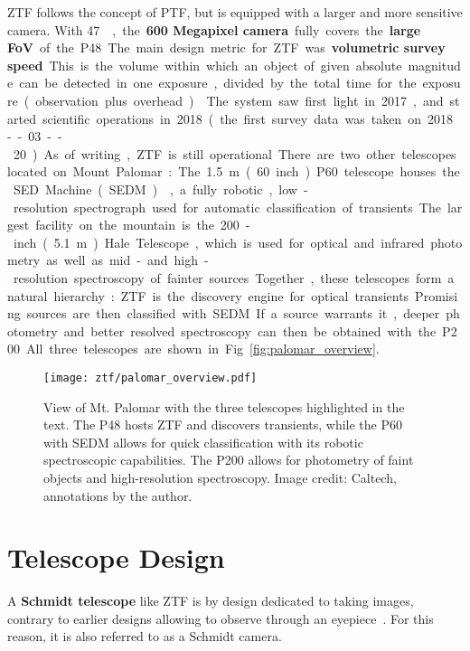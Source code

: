 ZTF follows the concept of PTF, but is equipped with a larger and more sensitive camera. With \SI{47}{\square\deg}, the \textbf{600 Megapixel camera} fully covers the \textbf{large FoV} of the P48. The main design metric for ZTF was \textbf{volumetric survey speed}. This is the volume within which an object of given absolute magnitude can be detected in one exposure, divided by the total time for the exposure (observation plus overhead)~. The system saw first light in 2017, and started scientific operations in 2018 (the first survey data was taken on 2018--03--20). As of writing, ZTF is still operational.

There are two other telescopes located on Mount Palomar: The \SI{1.5}{\meter} (60 inch) P60 telescope houses the SED Machine (SEDM)~, a fully robotic, low-resolution spectrograph used for automatic classification of transients. The largest facility on the mountain is the 200-inch (\SI{5.1}{\meter}) Hale Telescope, which is used for optical and infrared photometry as well as mid- and high-resolution spectroscopy of fainter sources. Together, these telescopes form a natural hierarchy: ZTF is the discovery engine for optical transients. Promising sources are then classified with SEDM. If a source warrants it, deeper photometry and better resolved spectroscopy can then be obtained with the P200. All three telescopes are shown in Fig.~\ref{fig:palomar_overview}.

\begin{figure*}[]
    \texttt{[image: ztf/palomar\_overview.pdf]}
    \caption[View of Mt. Palomar]{View of Mt. Palomar with the three telescopes highlighted in the text. The P48 hosts ZTF and discovers transients, while the P60 with SEDM allows for quick classification with its robotic spectroscopic capabilities. The P200 allows for photometry of faint objects and high-resolution spectroscopy. Image credit: Caltech, annotations by the author.}
\end{figure*}

\section{Telescope Design}\label{telescope_design}
A \textbf{Schmidt telescope} like ZTF is by design dedicated to taking images, contrary to earlier designs allowing to observe through an eyepiece~. For this reason, it is also referred to as a Schmidt camera.

